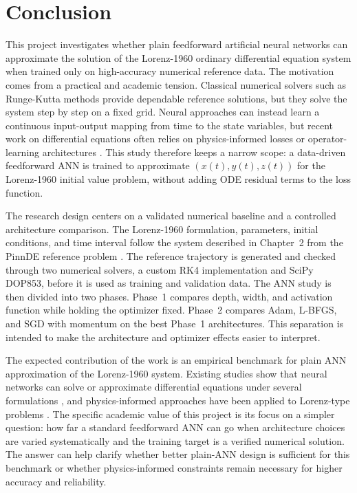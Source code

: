 \chapter{Conclusion}

This project investigates whether plain feedforward artificial neural networks can approximate the solution of the Lorenz-1960 ordinary differential equation system when trained only on high-accuracy numerical reference data. The motivation comes from a practical and academic tension. Classical numerical solvers such as Runge-Kutta methods provide dependable reference solutions, but they solve the system step by step on a fixed grid. Neural approaches can instead learn a continuous input-output mapping from time to the state variables, but recent work on differential equations often relies on physics-informed losses or operator-learning architectures \cite{matthews2024pinnde, babni2025error, lau2020oden}. This study therefore keeps a narrow scope: a data-driven feedforward ANN is trained to approximate $(x(t), y(t), z(t))$ for the Lorenz-1960 initial value problem, without adding ODE residual terms to the loss function.

The research design centers on a validated numerical baseline and a controlled architecture comparison. The Lorenz-1960 formulation, parameters, initial conditions, and time interval follow the system described in Chapter~2 from the PinnDE reference problem \cite{matthews2024pinnde}. The reference trajectory is generated and checked through two numerical solvers, a custom RK4 implementation and SciPy DOP853, before it is used as training and validation data. The ANN study is then divided into two phases. Phase~1 compares depth, width, and activation function while holding the optimizer fixed. Phase~2 compares Adam, L-BFGS, and SGD with momentum on the best Phase~1 architectures. This separation is intended to make the architecture and optimizer effects easier to interpret.

The expected contribution of the work is an empirical benchmark for plain ANN approximation of the Lorenz-1960 system. Existing studies show that neural networks can solve or approximate differential equations under several formulations \cite{mall2013comparison, okereke2021novel, dubey2024solving}, and physics-informed approaches have been applied to Lorenz-type problems \cite{matthews2024pinnde, aslam2024neuro}. The specific academic value of this project is its focus on a simpler question: how far a standard feedforward ANN can go when architecture choices are varied systematically and the training target is a verified numerical solution. The answer can help clarify whether better plain-ANN design is sufficient for this benchmark or whether physics-informed constraints remain necessary for higher accuracy and reliability.

